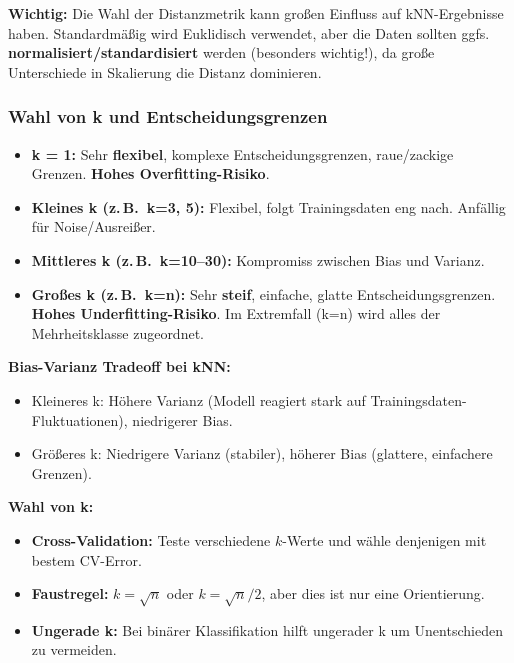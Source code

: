 \textbf{Wichtig:} Die Wahl der Distanzmetrik kann großen Einfluss auf kNN-Ergebnisse haben. Standardmäßig wird Euklidisch verwendet, aber die Daten sollten ggfs. \textbf{normalisiert/standardisiert} werden (besonders wichtig!), da große Unterschiede in Skalierung die Distanz dominieren.

\subsubsection{Wahl von k und Entscheidungsgrenzen}

\begin{itemize}[leftmargin=1.5em]
    \item \textbf{k = 1:} Sehr \textbf{flexibel}, komplexe Entscheidungsgrenzen, raue/zackige Grenzen. \textbf{Hohes Overfitting-Risiko}.
    \item \textbf{Kleines k (z.\,B.\ k=3, 5):} Flexibel, folgt Trainingsdaten eng nach. Anfällig für Noise/Ausreißer.
    \item \textbf{Mittleres k (z.\,B.\ k=10--30):} Kompromiss zwischen Bias und Varianz.
    \item \textbf{Großes k (z.\,B.\ k=n):} Sehr \textbf{steif}, einfache, glatte Entscheidungsgrenzen. \textbf{Hohes Underfitting-Risiko}. Im Extremfall (k=n) wird alles der Mehrheitsklasse zugeordnet.
\end{itemize}

\textbf{Bias-Varianz Tradeoff bei kNN:}
\begin{itemize}[leftmargin=1.5em]
    \item Kleineres k: Höhere Varianz (Modell reagiert stark auf Trainingsdaten-Fluktuationen), niedrigerer Bias.
    \item Größeres k: Niedrigere Varianz (stabiler), höherer Bias (glattere, einfachere Grenzen).
\end{itemize}

\textbf{Wahl von k:}
\begin{itemize}[leftmargin=1.5em]
    \item \textbf{Cross-Validation:} Teste verschiedene $k$-Werte und wähle denjenigen mit bestem CV-Error.
    \item \textbf{Faustregel:} $k = \sqrt{n}$ oder $k = \sqrt{n}/2$, aber dies ist nur eine Orientierung.
    \item \textbf{Ungerade k:} Bei binärer Klassifikation hilft ungerader k um Unentschieden zu vermeiden.
\end{itemize}

